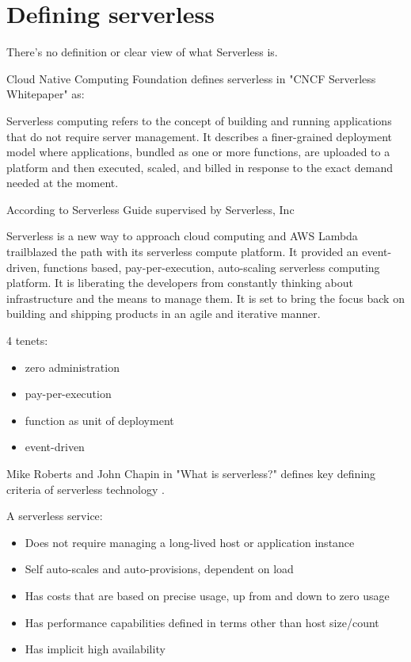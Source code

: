 \section*{Defining serverless}

There's no definition or clear view of what Serverless is.



Cloud Native Computing Foundation defines serverless in "CNCF Serverless Whitepaper" \cite{CNCF} as:

Serverless computing refers to the concept of building and running applications that do not require server management. It describes a finer-grained deployment model where applications, bundled as one or more functions, are uploaded to a platform and then executed, scaled, and billed in response to the exact demand needed at the moment. \newline




According to Serverless Guide supervised by Serverless, Inc

Serverless is a new way to approach cloud computing and AWS Lambda trailblazed the path with its serverless compute platform. It provided an event-driven, functions based, pay-per-execution, auto-scaling serverless computing platform. It is liberating the developers from constantly thinking about infrastructure and the means to manage them. It is set to bring the focus back on building and shipping products in an agile and iterative manner.

4 tenets:

\begin{itemize}
    \item zero administration
    \item pay-per-execution
    \item function as unit of deployment
    \item event-driven
\end{itemize}


Mike Roberts and John Chapin in "What is serverless?" defines key defining criteria of serverless technology \cite{RobertsChapin2017}.

A serverless service:
\begin{itemize}
    \item Does not require managing a long-lived host or application instance
    \item Self auto-scales and auto-provisions, dependent on load
    \item Has costs that are based on precise usage, up from and down to zero usage
    \item Has performance capabilities defined in terms other than host size/count
    \item Has implicit high availability
\end{itemize}

